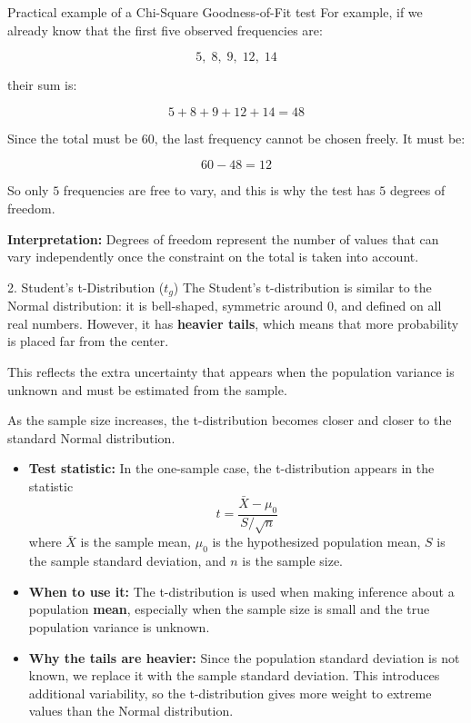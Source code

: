 \begin{example}{Practical example of a Chi-Square Goodness-of-Fit test}
For example, if we already know that the first five observed frequencies are:

\[
5,\;8,\;9,\;12,\;14
\]

their sum is:

\[
5+8+9+12+14=48
\]

Since the total must be \(60\), the last frequency cannot be chosen freely. It must be:

\[
60-48=12
\]

So only \(5\) frequencies are free to vary, and this is why the test has \(5\) degrees of freedom.

\textbf{Interpretation:} Degrees of freedom represent the number of values that can vary independently once the constraint on the total is taken into account.

\end{example}


\vs


\begin{defbox}{2. Student's t-Distribution (\(t_g\))}
The Student's t-distribution is similar to the Normal distribution: it is bell-shaped, symmetric around 0, and defined on all real numbers. However, it has \textbf{heavier tails}, which means that more probability is placed far from the center. 

\vs

This reflects the extra uncertainty that appears when the population variance is unknown and must be estimated from the sample.

\vs
As the sample size increases, the t-distribution becomes closer and closer to the standard Normal distribution.

\begin{itemize}

    \item \textbf{Test statistic:} In the one-sample case, the t-distribution appears in the statistic
    \begin{equation}
    t=\frac{\bar{X}-\mu_0}{S/\sqrt{n}}
    \end{equation}
    where \(\bar{X}\) is the sample mean, \(\mu_0\) is the hypothesized population mean, \(S\) is the sample standard deviation, and \(n\) is the sample size.

    \vs

      \item  \textbf{When to use it:} The t-distribution is used when making inference about a population \textbf{mean}, especially when the sample size is small and the true population variance is unknown.

   \vs
   \item \textbf{Why the tails are heavier:} Since the population standard deviation is not known, we replace it with the sample standard deviation. This introduces additional variability, so the t-distribution gives more weight to extreme values than the Normal distribution.


\end{itemize}
\end{defbox}






